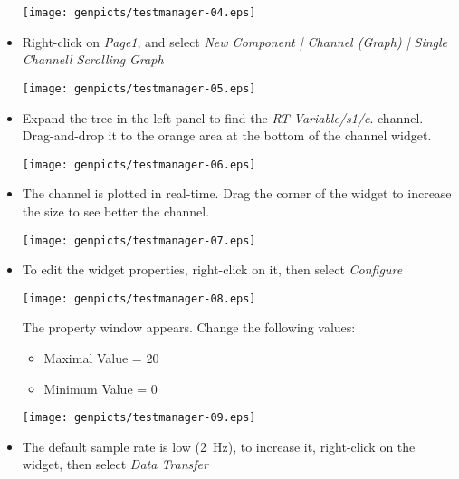 \begin{itemize}
\begin{center}
\texttt{[image: genpicts/testmanager-04.eps]}
\end{center}


\item Right-click on \textit{Page1}, and select \textit{New Component | Channel (Graph) | Single Channell Scrolling Graph}

\begin{center}
\texttt{[image: genpicts/testmanager-05.eps]}
\end{center}

\item Expand the tree in the left panel to find the
  \textit{RT-Variable/s1/c}. channel. Drag-and-drop it to the orange area at
  the bottom of the channel widget.

\begin{center}
\texttt{[image: genpicts/testmanager-06.eps]}
\end{center}


\item The channel is plotted in real-time. Drag the corner of the widget to
  increase the size to see better the channel.

\begin{center}
\texttt{[image: genpicts/testmanager-07.eps]}
\end{center}


\item To edit the widget properties, right-click on it, then select \textit{Configure}

\begin{center}
\texttt{[image: genpicts/testmanager-08.eps]}
\end{center}

The property window appears. Change the following values:
\begin{itemize}
\item Maximal Value = 20
\item Minimum Value = 0
\end{itemize}

\begin{center}
\texttt{[image: genpicts/testmanager-09.eps]}
\end{center}

\item The default sample rate is low (2~Hz), to increase it,
  right-click on the widget, then select \textit{Data Transfer}


\end{itemize}
